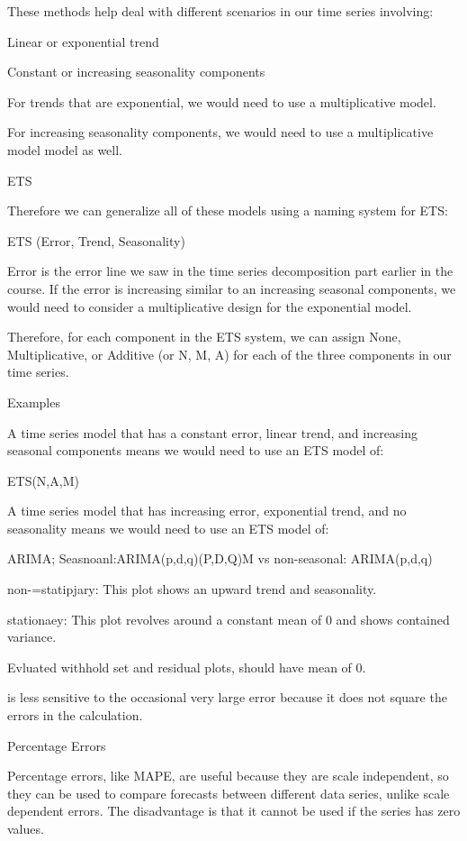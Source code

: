 \documentclass[]{book}
\theoremstyle{definition}
\theoremstyle{definition}
\theoremstyle{definition}
\theoremstyle{remark}
\begin{document}
These methods help deal with different scenarios in our time series
involving:

Linear or exponential trend

Constant or increasing seasonality components

For trends that are exponential, we would need to use a multiplicative
model.

For increasing seasonality components, we would need to use a
multiplicative model model as well.

ETS

Therefore we can generalize all of these models using a naming system
for ETS:

ETS (Error, Trend, Seasonality)

Error is the error line we saw in the time series decomposition part
earlier in the course. If the error is increasing similar to an
increasing seasonal components, we would need to consider a
multiplicative design for the exponential model.

Therefore, for each component in the ETS system, we can assign None,
Multiplicative, or Additive (or N, M, A) for each of the three
components in our time series.

Examples

A time series model that has a constant error, linear trend, and
increasing seasonal components means we would need to use an ETS model
of:

ETS(N,A,M)

A time series model that has increasing error, exponential trend, and no
seasonality means we would need to use an ETS model of:

ARIMA; Seasnoanl:ARIMA(p,d,q)(P,D,Q)M vs non-seasonal: ARIMA(p,d,q)

non-=statipjary: This plot shows an upward trend and seasonality.

stationaey: This plot revolves around a constant mean of 0 and shows
contained variance.

Evluated withhold set and residual plots, should have mean of 0.

is less sensitive to the occasional very large error because it does not
square the errors in the calculation.

Percentage Errors

Percentage errors, like MAPE, are useful because they are scale
independent, so they can be used to compare forecasts between different
data series, unlike scale dependent errors. The disadvantage is that it
cannot be used if the series has zero values.
\end{document}
